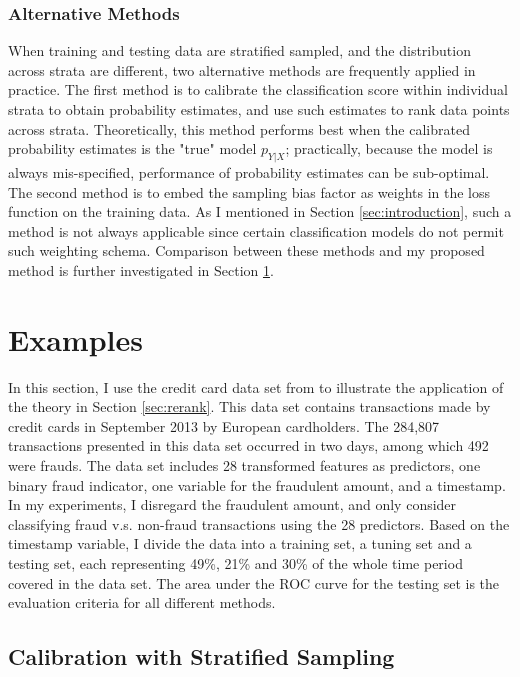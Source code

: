 \documentclass{article} %
\begin{document}
\subsubsection{Alternative Methods}

When training and testing data are stratified sampled, and the distribution across strata are different, two alternative methods are frequently applied in practice. The first method is to calibrate the classification score within individual strata to obtain probability estimates, and use such estimates to rank data points across strata. Theoretically, this method performs best when the calibrated probability estimates is the "true" model $p_{Y|X}$; practically, because the model is always mis-specified, performance of probability estimates can be sub-optimal. The second method is to embed the sampling bias factor as weights in the loss function on the training data. As I mentioned in Section \ref{sec:introduction}, such a method is not always applicable since certain classification models do not permit such weighting schema. Comparison between these methods and my proposed method is further investigated in Section \ref{sec:examples}.

\section{Examples}\label{sec:examples}

In this section, I use the credit card data set from \cite{dal2015calibrating} to illustrate the application of the theory in Section \ref{sec:rerank}. This data set contains transactions made by credit cards in September 2013 by European cardholders. The 284,807 transactions presented in this data set occurred in two days, among which 492 were frauds. The data set includes 28 transformed features as predictors, one binary fraud indicator, one variable for the fraudulent amount, and a timestamp. In my experiments, I disregard the fraudulent amount, and only consider classifying fraud v.s. non-fraud transactions using the 28 predictors. Based on the timestamp variable, I divide the data into a training set, a tuning set and a testing set, each representing 49\%, 21\% and 30\% of the whole time period covered in the data set. The area under the ROC curve for the testing set is the evaluation criteria for all different methods.

\subsection{Calibration with Stratified Sampling}
\end{document}
